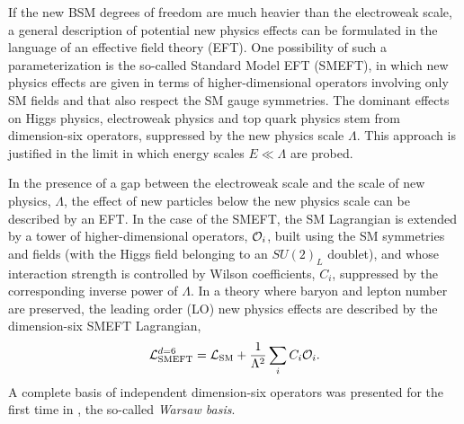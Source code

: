 \par If the new BSM degrees of freedom are much heavier than the electroweak scale, a general description of potential new physics effects can be formulated in the language of an effective field theory (EFT). One possibility of such a parameterization is the so-called Standard Model EFT (SMEFT), in which new physics effects are given in terms of higher-dimensional operators involving only SM fields and that also respect the SM gauge symmetries.  The dominant effects on Higgs physics, electroweak physics and top quark physics stem from dimension-six operators, suppressed by the new physics scale $\Lambda$. This approach is justified in the limit 
in which energy scales $E\ll \Lambda$ are probed. 
 \par In the presence of a gap between the electroweak scale and the scale of new physics, $\Lambda$, the effect of new particles below the new physics scale can be described by an EFT. In the case of the SMEFT, the SM Lagrangian is extended by a tower of higher-dimensional operators, ${\cal O}_i$, built using the SM symmetries and fields (with the Higgs field belonging to an $SU(2)_L$ doublet), and whose interaction strength is controlled by Wilson coefficients, $C_i$, suppressed by the corresponding inverse power of $\Lambda$. In a theory where baryon and lepton number are preserved, the leading order (LO) new physics effects are described by the dimension-six  SMEFT Lagrangian,
\begin{equation}
	\mathcal{L}_{\mathrm{SMEFT}}^{d=6}=\mathcal{L}_{\mathrm{SM}} + \frac{1}{\Lambda^2}\sum_i C_i  {\cal O}_i.
\end{equation}
A complete basis of independent dimension-six operators was presented for the first time in \cite{Grzadkowski:2010es}, the so-called \textit{ Warsaw basis}.

